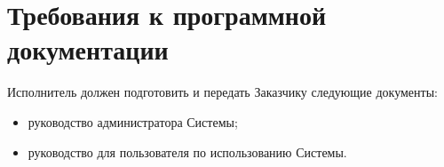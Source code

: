 \documentclass{bmstu-gost-7-32}
\begin{document}

\section{Требования к программной документации}



Исполнитель должен подготовить и передать Заказчику следующие документы:
\begin{itemize}
	\item руководство администратора Системы;
	\item руководство для пользователя по использованию Системы.
\end{itemize}



\end{document}
